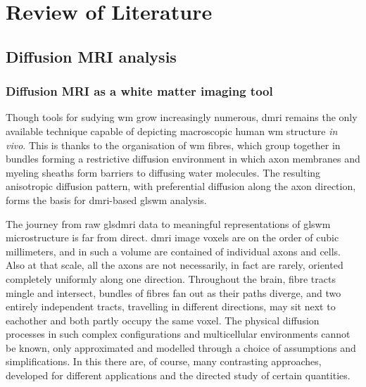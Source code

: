 \chapter{Review of Literature}
\label{review}



\section{Diffusion MRI analysis}


\subsection{Diffusion MRI as a white matter imaging tool}

Though tools for sudying \gls{wm} grow increasingly numerous, \gls{dmri} remains the only available technique capable of depicting macroscopic  human \gls{wm} structure \textit{in vivo}.
This is thanks to the  organisation of \gls{wm} fibres, which group together in bundles forming a restrictive diffusion environment in which axon membranes and myeling sheaths form barriers to diffusing water molecules.
The resulting anisotropic diffusion pattern, with preferential diffusion along the axon direction, forms the basis for \gls{dmri}-based glswm analysis.

The journey from raw glsdmri data to meaningful representations of glswm microstructure is far from direct.
\Gls{dmri} image \glspl{voxel} are on the order of cubic millimeters, and in such a volume are contained  of individual axons and cells.
Also at that scale, all the axons are not necessarily, in fact are rarely, oriented completely uniformly along one direction.
Throughout the brain, fibre tracts mingle and intersect, bundles of fibres fan out as their paths diverge, and two entirely independent tracts, travelling in different directions, may sit next to eachother and both partly occupy the same voxel.
The physical diffusion processes in such complex configurations and multicellular environments cannot be known, only approximated and modelled through a choice of assumptions and simplifications.
In this there are, of course, many contrasting approaches, developed for different applications and the directed study of certain quantities.

